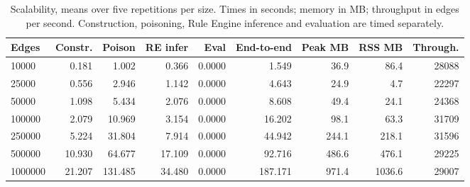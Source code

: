 \begin{table}[t]
\centering
\caption{Scalability, means over five repetitions per size. Times in seconds; memory in MB; throughput in edges per second. Construction, poisoning, Rule Engine inference and evaluation are timed separately.}
\label{tab:scalabilitydetail}
{\small
\begin{tabular}{lrrrrrrrr}
\toprule
Edges & Constr. & Poison & RE infer & Eval & End-to-end & Peak MB & RSS MB & Through. \\
\midrule
10000 & 0.181 & 1.002 & 0.366 & 0.0000 & 1.549 & 36.9 & 86.4 & 28088 \\
25000 & 0.556 & 2.946 & 1.142 & 0.0000 & 4.643 & 24.9 & 4.7 & 22297 \\
50000 & 1.098 & 5.434 & 2.076 & 0.0000 & 8.608 & 49.4 & 24.1 & 24368 \\
100000 & 2.079 & 10.969 & 3.154 & 0.0000 & 16.202 & 98.1 & 63.3 & 31709 \\
250000 & 5.224 & 31.804 & 7.914 & 0.0000 & 44.942 & 244.1 & 218.1 & 31596 \\
500000 & 10.930 & 64.677 & 17.109 & 0.0000 & 92.716 & 486.6 & 476.1 & 29225 \\
1000000 & 21.207 & 131.485 & 34.480 & 0.0000 & 187.171 & 971.4 & 1036.6 & 29007 \\
\bottomrule
\end{tabular}
}
\end{table}

